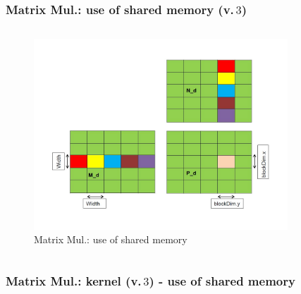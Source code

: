 \begin{frame}
   \frametitle{Matrix Mul.: use of shared memory (v.\,$3$)}
      \begin{columns}
           \begin{figure}[H]
              \centering
              \includegraphics[width=0.85\textwidth]{./img/mulC.jpg}
                   \caption{\small{Matrix Mul.: use of shared memory}}
           \end{figure}
     \end{columns}
\end{frame}

	
\begin{frame}
        \frametitle{Matrix Mul.: kernel (v.\,$3$) - use of shared memory}
        
\end{frame}


